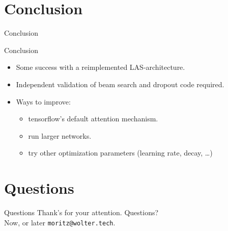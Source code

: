 \documentclass{beamer}
\begin{document}
\section{Conclusion}
\begin{frame}{Conclusion}

\begin{table}
\caption{Selected important experiment parameters and test set phoneme error rate.}
\end{table}

\end{frame}

\begin{frame}{Conclusion}
\begin{itemize}
	\item Some success with a reimplemented LAS-architecture.
	\item Independent validation of beam search and dropout code required.
	\item Ways to improve:
		\begin{itemize}
			\item tensorflow's default attention mechanism.
			\item run larger networks.
			\item try other optimization parameters (learning rate, decay, \dots)
		\end{itemize}
\end{itemize}
\end{frame}


\section{Questions}
\begin{frame}{Questions}
	Thank's for your attention. Questions? \\
	Now, or later \texttt{moritz@wolter.tech}.
\end{frame}
\end{document}
